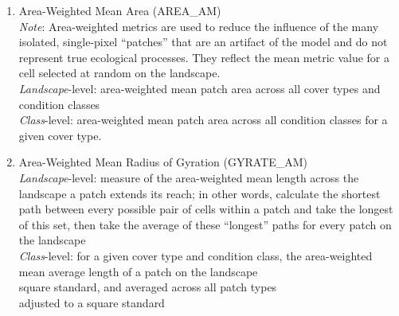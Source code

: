 \begin{enumerate}
	
	\item Area-Weighted Mean Area (AREA\_AM)\\
	\emph{Note}: Area-weighted metrics are used to reduce the influence of the many isolated, single-pixel ``patches'' that are an artifact of the 
model and do not represent true ecological processes. They reflect the mean metric value for a cell selected at random on the landscape. 	\\
	\emph{Landscape}-level: area-weighted mean patch area across all cover types and condition classes \\
	\emph{Class}-level: area-weighted mean patch area across all condition classes for a given cover type. \\
	
	\item Area-Weighted Mean Radius of Gyration (GYRATE\_AM)\\
	\emph{Landscape}-level: measure of the area-weighted mean length across the landscape a patch extends its reach; in other words, calculate the 
shortest path between every possible pair of cells within a patch and take the longest of this set, then take the average of these ``longest'' 
paths for every patch on the landscape\\
	\emph{Class}-level: for a given cover type and condition class, the area-weighted mean average length of a patch on the landscape\\
	
square standard, and averaged across all patch types\\
adjusted to a square standard \\
	

\end{enumerate}
